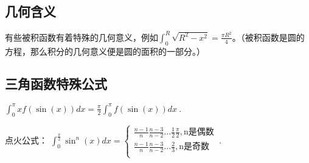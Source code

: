 \subsection{几何含义}
有些被积函数有着特殊的几何意义，例如$\int ^R_0 \sqrt{R^2-x^2}=\frac{\pi R^2}{4}$。（被积函数是圆的方程，那么积分的几何意义便是圆的面积的一部分。）

\subsection{三角函数特殊公式}
$\int ^\pi_0 x f(\sin(x))dx = \frac{\pi}{2}\int ^\pi_0 f(\sin(x))dx~.$

点火公式：
$
\int ^{\frac{\pi}{2}}_{0} \sin^n(x) dx= 
\left \{
\begin{aligned}
\frac{n-1}{n} \frac{n-3}{n-2}...\frac{1}{2} \frac{\pi}{2},\text{n是偶数}\\
\frac{n-1}{n} \frac{n-3}{n-2}...\frac{2}{3},\text{n是奇数}\\
\end{aligned}~.
\right.
$
